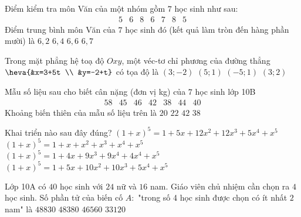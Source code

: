 \begin{ex}%
	Điểm kiểm tra môn Văn của một nhóm gồm $7$ học sinh như sau:
	$$
	\begin{array}{llllllll}
		5 & 6 & 8 & 6 & 7 & 8 & 5
	\end{array}
	$$
	Điểm trung bình môn Văn của $7$ học sinh đó (kết quả làm tròn đến hàng phần mười) là
	\choice
	{$6{,}2$}
	{\True $6{,}4$}
	{$6{,}6$}
	{$6{,}7$}
\end{ex}
\begin{ex}%
	Trong mặt phẳng hệ toạ độ $Oxy$, một véc-tơ chỉ phương của đường thẳng $\heva{&x=3+5t \\ &y=-2+t}$ có tọa độ là
	\choice
	{$(3; -2)$}
	{\True $(5; 1)$}
	{$(-5; 1)$}
	{$(3; 2)$}
\end{ex}
\begin{ex}%
	Mẫu số liệu sau cho biết cân nặng (đơn vị kg) của $7$ học sinh lớp 10B
	$$
	\begin{array}{lllllll}
		58 & 45 & 46 & 42 & 38 & 44 & 40
	\end{array}
	$$
	Khoảng biến thiên của mẫu số liệu trên là
	\choice
	{\True $20$}
	{$22$}
	{$42$}
	{$38$}
\end{ex}
\begin{ex}%
	Khai triển nào sau đây đúng?
	\choice
	{$(1+x)^5=1+5 x+12 x^2+12 x^3+5 x^4+x^5$}
	{$(1+x)^5=1+x+x^2+x^3+x^4+x^5$}
	{$(1+x)^5=1+4 x+9 x^3+9 x^4+4 x^4+x^5$}
	{\True $(1+x)^5=1+5 x+10 x^2+10 x^3+5 x^4+x^5$}
\end{ex}
\begin{ex}%
	Lớp 10A có $40$ học sinh với $24$ nữ và $16$ nam. Giáo viên chủ nhiệm cần chọn ra $4$ học sinh. Số phần tử của biến cố $A\colon$ "trong số 4 học sinh được chọn có ít nhất $2$ nam" là
	\choice
	{$48830$}
	{\True $48380$}
	{$46560$}
	{$33120$}
\end{ex}
